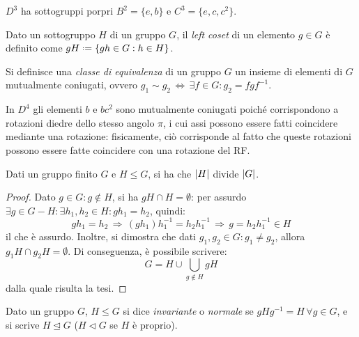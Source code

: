 \begin{example}
	$ D^3 $ ha sottogruppi porpri $ B^2 = \{e,b\} $ e $ C^3 = \{e,c,c^2\} $.
\end{example}

\begin{definition}
	Dato un sottogruppo $ H $ di un gruppo $ G $, il \textit{left coset} di un elemento $ g \in G $ è definito come $ gH \defeq \{ gh \in G : h \in H\} $.
\end{definition}

\begin{definition}
	Si definisce una \textit{classe di equivalenza} di un gruppo $ G $ un insieme di elementi di $ G $ mutualmente coniugati, ovvero $ g_1 \sim g_2 \,\Leftrightarrow\, \exists f \in G : g_2 = f g f^{-1} $.
\end{definition}

\begin{example}
	In $ D^4 $ gli elementi $ b $ e $ bc^2 $ sono mutualmente coniugati poiché corrispondono a rotazioni diedre dello stesso angolo $ \pi $, i cui assi possono essere fatti coincidere mediante una rotazione: fisicamente, ciò corrisponde al fatto che queste rotazioni possono essere fatte coincidere con una rotazione del RF.
\end{example}

\begin{theorem}[Lagrange]
	Dati un gruppo finito $ G $ e $ H \le G $, si ha che $ \left\lvert H\right\rvert $ divide $ \left\lvert G\right\rvert $.
\end{theorem}
\begin{proof}
	Dato $ g \in G : g \notin H $, si ha $ gH \cap H = \emptyset $: per assurdo $ \exists g \in G - H : \exists h_1,h_2 \in H : g h_1 = h_2 $, quindi:
	\begin{equation*}
		g h_1 = h_2 \,\Rightarrow\, (g h_1) h_1^{-1} = h_2 h_1^{-1} \,\Rightarrow\, g = h_2 h_1^{-1} \in H
	\end{equation*}
	il che è assurdo. Inoltre, si dimostra che dati $ g_1, g_2 \in G : g_1 \neq g_2 $, allora $ g_1 H \cap g_2 H = \emptyset $. Di conseguenza, è possibile scrivere:
	\begin{equation}
		G = H \cup \bigcup_{g \notin H} gH
		\label{eq:7.1}
	\end{equation}
	dalla quale risulta la tesi.
\end{proof}

\begin{definition}
	Dato un gruppo $ G $, $ H \le G $ si dice \textit{invariante} o \textit{normale} se $ gHg^{-1} = H \,\forall g \in G $, e si scrive $ H \trianglelefteq G $ ($ H \triangleleft G $ se $ H $ è proprio).
\end{definition}

